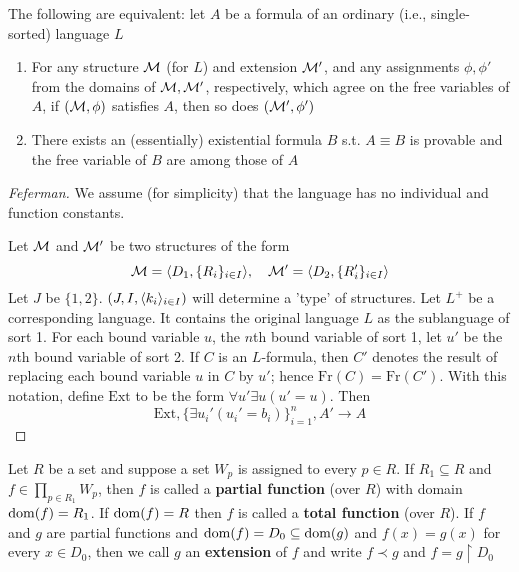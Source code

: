 \documentclass[11pt]{article}
\def \Fr {\text{Fr}}
\def \Ext {\text{Ext}}
\begin{document}
\begin{corollary}
The following are equivalent: let \(A\) be a formula of an ordinary (i.e., single-sorted)
language \(L\)
\begin{enumerate}
\item For any structure \(\mathcal{M}\) (for \(L\)) and extension \(\mathcal{M}'\), and any
assignments \(\phi,\phi'\) from the domains of \(\mathcal{M},\mathcal{M}'\), respectively, which agree on the
free variables of \(A\), if \((\mathcal{M},\phi)\) satisfies \(A\), then so does \((\mathcal{M}',\phi')\)
\item There exists an (essentially) existential formula \(B\) s.t. \(A\equiv B\) is provable and the
free variable of \(B\) are among those of \(A\)
\end{enumerate}
\end{corollary}

\begin{proof}[Feferman]
We assume (for simplicity) that the language has no individual and function constants.

Let \(\mathcal{M}\) and \(\mathcal{M}'\) be two structures of the form
\begin{equation*}
\mathcal{M}=\langle D_1,\{R_i\}_{i\in I}\rangle,\quad
\mathcal{M}'=\langle D_2,\{R_i'\}_{i\in I}\rangle
\end{equation*}
Let \(J\) be \(\{1,2\}\). \((J,I,\langle k_i\rangle_{i\in I})\) will determine a 'type' of structures.
Let \(L^+\) be a corresponding language. It contains the original language \(L\) as the
sublanguage of sort 1. For each bound variable \(u\), the \(n\)th bound variable of sort 1,
let \(u'\) be the \(n\)th bound variable of sort 2. If \(C\) is an \(L\)-formula, then \(C'\)
denotes the result of replacing each bound variable \(u\) in \(C\) by \(u'\);
hence \(\Fr(C)=\Fr(C')\). With this notation, define \(\Ext\) to be the form
\(\forall u'\exists u(u'=u)\). Then
\begin{equation*}
\Ext,\{\exists u_i'(u_i'=b_i)\}_{i=1}^n,A'\to A
\end{equation*}
\end{proof}

\begin{definition}[]
Let \(R\) be a set and suppose a set \(W_p\) is assigned to every \(p\in R\).
If \(R_1\subseteq R\) and \(f\in\prod_{p\in R_1}W_p\), then \(f\) is called a \textbf{partial function}
(over \(R\)) with domain \(\operatorname{dom}(f)=R_1\). If \(\operatorname{dom}(f)=R\) then \(f\) is called a \textbf{total function}
(over \(R\)). If \(f\) and \(g\) are partial functions and \(\operatorname{dom}(f)=D_0\subseteq\operatorname{dom}(g)\)
and \(f(x)=g(x)\) for every \(x\in D_0\), then we call \(g\) an \textbf{extension} of \(f\) and
write \(f\prec g\) and \(f=g\restriction D_0\)
\end{definition}
\end{document}

